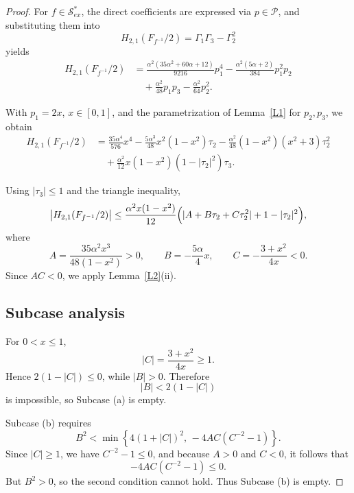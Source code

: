 \documentclass[10pt,a4paper]{amsart}
\numberwithin{equation}{section}
\begin{document}
\begin{proof}
For $f\in\mathcal{S}_{ex}^{\ast}$, the direct coefficients are expressed via $p\in\mathcal{P}$, and substituting them into
\[
H_{2,1}(F_{f^{-1}}/2)=\Gamma_1\Gamma_3-\Gamma_2^2
\]
yields
\begin{equation}\label{ND20}
\begin{aligned}
H_{2,1}\!\left(F_{f^{-1}}/2\right)
&=
\frac{\alpha^2(35\alpha^2+60\alpha+12)}{9216}p_1^4
-\frac{\alpha^2(5\alpha+2)}{384}p_1^2p_2\\
&\quad
+\frac{\alpha^2}{48}p_1p_3
-\frac{\alpha^2}{64}p_2^2.
\end{aligned}
\end{equation}

With $p_1=2x$, $x\in[0,1]$, and the parametrization of Lemma~\ref{L1} for $p_2,p_3$, we obtain
\begin{equation}\label{ND21}
\begin{aligned}
H_{2,1}\!\left(F_{f^{-1}}/2\right)
&=
\frac{35\alpha^4}{576}x^4
-\frac{5\alpha^3}{48}x^2(1-x^2)\tau_2
-\frac{\alpha^2}{48}(1-x^2)(x^2+3)\tau_2^2\\
&\quad
+\frac{\alpha^2}{12}x(1-x^2)(1-|\tau_2|^2)\tau_3.
\end{aligned}
\end{equation}

Using $|\tau_3|\le 1$ and the triangle inequality,
\begin{equation}\label{ND22}
\bigl|H_{2,1}(F_{f^{-1}}/2)\bigr|
\le
\frac{\alpha^2 x(1-x^2)}{12}
\Bigl(
|A+B\tau_2+C\tau_2^2|+1-|\tau_2|^2
\Bigr),
\end{equation}
where
\[
A=\frac{35\alpha^2 x^3}{48(1-x^2)}>0,
\qquad
B=-\frac{5\alpha}{4}x,
\qquad
C=-\frac{3+x^2}{4x}<0.
\]
Since $AC<0$, we apply Lemma~\ref{L2}(ii).

\subsection*{Subcase analysis}

For $0<x\le 1$,
\[
|C|=\frac{3+x^2}{4x}\ge 1.
\]
Hence $2(1-|C|)\le 0$, while $|B|>0$. Therefore
\[
|B|<2(1-|C|)
\]
is impossible, so Subcase (a) is empty.

Subcase (b) requires
\[
B^2<\min\left\{4(1+|C|)^2,\,-4AC(C^{-2}-1)\right\}.
\]
Since $|C|\ge 1$, we have $C^{-2}-1\le 0$, and because $A>0$ and $C<0$, it follows that
\[
-4AC(C^{-2}-1)\le 0.
\]
But $B^2>0$, so the second condition cannot hold. Thus Subcase (b) is empty.


\end{proof}
\end{document}
